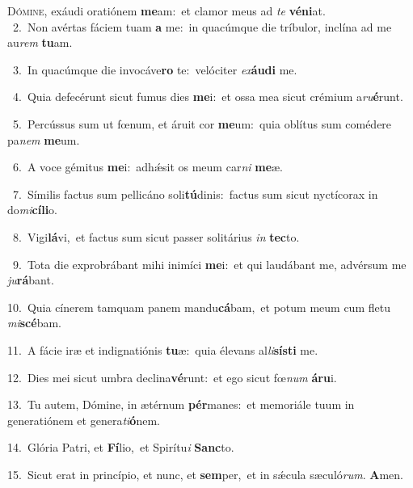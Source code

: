 \lettrine{\initial\textcolor{\initialcolor}{D}}{ómine,} exáudi oratiónem \textbf{me}\-am:~\star et clamor meus ad \textit{te} \textbf{vé}\-\textbf{ni}at.\\
{\numbfont\textcolor{\numbcolor}{~2.}}~Non avértas fáciem tuam \textbf{a} me:~\star in quacúmque die tríbulor, inclína ad me au\textit{rem} \textbf{tu}\-am.\par
{\numbfont\textcolor{\numbcolor}{~3.}}~In quacúmque die invocáve\textbf{ro} te:~\star velóciter \textit{ex}\-\textbf{áu}\textbf{di} me.\par
{\numbfont\textcolor{\numbcolor}{~4.}}~Quia defecérunt sicut fumus dies \textbf{me}\-i:~\star et ossa mea sicut crémium a\-\textit{ru}\-\textbf{é}runt.\par
{\numbfont\textcolor{\numbcolor}{~5.}}~Percússus sum ut fœnum, et áruit cor \textbf{me}\-um:~\star quia oblítus sum comédere pa\textit{nem} \textbf{me}\-um.\par
{\numbfont\textcolor{\numbcolor}{~6.}}~A voce gémitus \textbf{me}\-i:~\star adhǽsit os meum car\textit{ni} \textbf{me}\-æ.\par
{\numbfont\textcolor{\numbcolor}{~7.}}~Símilis factus sum pellicáno soli\-\textbf{tú}\-dinis:~\star factus sum sicut nyctícorax in do\-\textit{mi}\-\textbf{cí}\textbf{li}o.\par
{\numbfont\textcolor{\numbcolor}{~8.}}~Vigi\-\textbf{lá}\-vi,~\star et factus sum sicut passer solitárius \textit{in} \textbf{tec}\-to.\par
{\numbfont\textcolor{\numbcolor}{~9.}}~Tota die exprobrábant mihi inimíci \textbf{me}\-i:~\star et qui laudábant me, advérsum me \textit{ju}\-\textbf{rá}bant.\par
{\numbfont\textcolor{\numbcolor}{10.}}~Quia cínerem tamquam panem mandu\-\textbf{cá}\-bam,~\star et potum meum cum fletu \textit{mi}\-\textbf{scé}bam.\par
{\numbfont\textcolor{\numbcolor}{11.}}~A fácie iræ et indignatiónis \textbf{tu}\-æ:~\star quia élevans al\-\textit{li}\-\textbf{sís}\textbf{ti} me.\par
{\numbfont\textcolor{\numbcolor}{12.}}~Dies mei sicut umbra declina\-\textbf{vé}\-runt:~\star et ego sicut fœ\textit{num} \textbf{á}\-\textbf{ru}i.\par
{\numbfont\textcolor{\numbcolor}{13.}}~Tu autem, Dómine, in ætérnum \textbf{pér}\-manes:~\star et memoriále tuum in generatiónem et genera\-\textit{ti}\-\textbf{ó}nem.\par
{\numbfont\textcolor{\numbcolor}{14.}}~Glória Patri, et \textbf{Fí}\-lio,~\star et Spirítu\textit{i} \textbf{Sanc}\-to.\par
{\numbfont\textcolor{\numbcolor}{15.}}~Sicut erat in princípio, et nunc, et \textbf{sem}\-per,~\star et in sǽcula sæculó\-\textit{rum}\-. \textbf{A}\-men.\par
